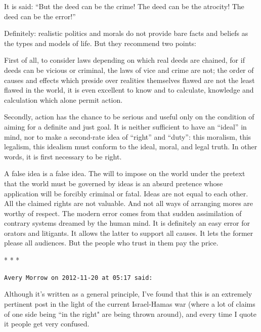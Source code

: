 It is said: “But the deed can be the crime! The deed can be the atrocity! The deed can be the error!”

Definitely: realistic politics and morals do not provide bare facts and beliefs as the types and models of life. But they recommend two points:

First of all, to consider laws depending on which real deeds are chained, for if deeds can be vicious or criminal, the laws of vice and crime are not; the order of causes and effects which preside over realities themselves flawed are not the least flawed in the world, it is even excellent to know and to calculate, knowledge and calculation which alone permit action.

Secondly, action has the chance to be serious and useful only on the condition of aiming for a definite and just goal. It is neither sufficient to have an “ideal” in mind, nor to make a second-rate idea of “right” and “duty”: this moralism, this legalism, this idealism must conform to the ideal, moral, and legal truth. In other words, it is first necessary to be right.

A false idea is a false idea. The will to impose on the world under the pretext that the world must be governed by ideas is an absurd pretence whose application will be forcibly criminal or fatal. Ideas are not equal to each other. All the claimed rights are not valuable. And not all ways of arranging mores are worthy of respect. The modern error comes from that sudden assimilation of contrary systems dreamed by the human mind. It is definitely an easy error for orators and litigants. It allows the latter to support all causes. It lets the former please all audiences. But the people who trust in them pay the price.



\begin{center}* * *\end{center}

\begin{footnotesize}\begin{sffamily}



\texttt{Avery Morrow on 2012-11-20 at 05:17 said: }

Although it's written as a general principle, I've found that this is an extremely pertinent post in the light of the current Israel-Hamas war (where a lot of claims of one side being ``in the right" are being thrown around), and every time I quote it people get very confused.


\end{sffamily}\end{footnotesize}
